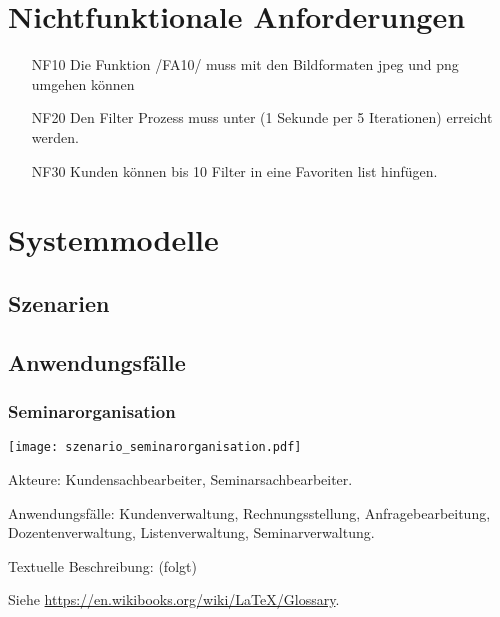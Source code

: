 \documentclass[parskip=full]{scrartcl}
\begin{document}
\section{Nichtfunktionale Anforderungen}
\begin{itemize}[nosep]
\item[NF10] Die Funktion /FA10/ muss mit den Bildformaten jpeg und png umgehen können
\item[NF20] Den Filter Prozess muss unter (1 Sekunde per 5 Iterationen) erreicht werden.
\item[NF30] Kunden können bis 10 Filter in eine Favoriten list hinfügen.
\end{itemize}

\section{Systemmodelle}

\subsection{Szenarien}

\subsection{Anwendungsfälle}
\subsubsection{Seminarorganisation}
\begin{center}
\texttt{[image: szenario\_seminarorganisation.pdf]}
\end{center}

Akteure: Kundensachbearbeiter, Seminarsachbearbeiter.

Anwendungsfälle: Kundenverwaltung, Rechnungsstellung, Anfragebearbeitung, Dozentenverwaltung, Listenverwaltung, Seminarverwaltung.

Textuelle Beschreibung: (folgt)



%
%
\printnoidxglossaries
Siehe \url{https://en.wikibooks.org/wiki/LaTeX/Glossary}.
\end{document}
